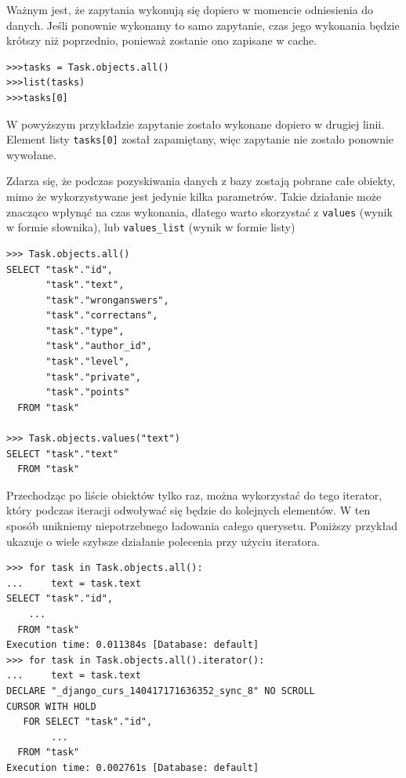 \documentclass[oneside,polski,logo,indent]{amuthesis}
\begin{document}
\begin{enumerate}
\begin{enumerate}
Ważnym jest, że zapytania wykonują się dopiero w momencie odniesienia do danych. Jeśli ponownie wykonamy to samo zapytanie, czas jego wykonania będzie krótszy niż poprzednio, ponieważ zostanie ono zapisane w cache.
\begin{lstlisting}[style=DOS]
>>>tasks = Task.objects.all()
>>>list(tasks)
>>>tasks[0]
\end{lstlisting}
W powyższym przykładzie zapytanie zostało wykonane dopiero w drugiej linii. Element listy \texttt{tasks[0]} został zapamiętany, więc zapytanie nie zostało ponownie wywołane.

Zdarza się, że podczas pozyskiwania danych z bazy zostają pobrane całe obiekty, mimo że wykorzystywane jest jedynie kilka parametrów. Takie działanie może znacząco wpłynąć na czas wykonania, dlatego warto skorzystać z \texttt{values} (wynik w formie słownika), lub \texttt{values\_list} (wynik w formie listy)
\begin{lstlisting}[style=DOS]
>>> Task.objects.all()
SELECT "task"."id",
       "task"."text",
       "task"."wronganswers",
       "task"."correctans",
       "task"."type",
       "task"."author_id",
       "task"."level",
       "task"."private",
       "task"."points"
  FROM "task"

>>> Task.objects.values("text")
SELECT "task"."text"
  FROM "task"
\end{lstlisting}
Przechodząc po liście obiektów tylko raz, można wykorzystać do tego iterator, który podczas iteracji odwoływać się będzie do kolejnych elementów. W ten sposób unikniemy niepotrzebnego ładowania całego querysetu. Poniższy przykład ukazuje o wiele szybsze działanie polecenia przy użyciu iteratora.
\begin{lstlisting}[style=DOS]
>>> for task in Task.objects.all():
...     text = task.text
SELECT "task"."id",
	...
  FROM "task"
Execution time: 0.011384s [Database: default]
>>> for task in Task.objects.all().iterator():
...     text = task.text
DECLARE "_django_curs_140417171636352_sync_8" NO SCROLL
CURSOR WITH HOLD
   FOR SELECT "task"."id",
		...
  FROM "task"
Execution time: 0.002761s [Database: default]
\end{lstlisting}


\end{enumerate}
\end{enumerate}
\end{document}
